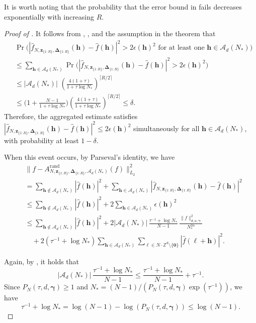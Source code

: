 \documentclass[pdflatex,sn-basic,Numbered]{sn-jnl}%
\newcommand{\rand}{\mathrm{rand}}
\newcommand{\bszero}{\boldsymbol{0}}
\newcommand{\bsh}{\boldsymbol{h}}
\newcommand{\bsl}{\boldsymbol{\ell}}
\newcommand{\bsz}{\boldsymbol{z}}
\newcommand{\bsgamma}{\boldsymbol{\gamma}}
\newcommand{\bsDelta}{\boldsymbol{\Delta}}
\newcommand{\ZZ}{\mathbb{Z}}
\newcommand{\Acal}{\mathcal{A}}
\theoremstyle{thmstyleone}%
\theoremstyle{thmstyletwo}%
\begin{document}
It is worth noting that the probability that the error bound in  fails decreases exponentially with increasing $R$.

\begin{proof}[Proof of ]
    It follows from , , and the assumption in the theorem that
    \begin{align*}
    & \Pr\Big(|\widehat{f}_{N,\bsz_{\{1{:}R\}},\bsDelta_{\{1{:}R\}}}(\bsh)-\widehat{f}(\bsh)|^2> 2\epsilon(\bsh)^2 \text{ for at least one }  \bsh\in \Acal_d(N_*)\Big)\\  
    &\le \sum_{\bsh\in \Acal_d(N_*)}\Pr\Big(|\widehat{f}_{N,\bsz_{\{1{:}R\}},\bsDelta_{\{1{:}R\}}}(\bsh)-\widehat{f}(\bsh)|^2> 2\epsilon(\bsh)^2\Big) \\
    &\le |\Acal_d(N_*)| \, \,  \left(\frac{4(1+\tau)}{1+\tau\log N_* }\right)^{\lceil R/2 \rceil} \\
    &\le  
    \Big(1+\frac{N-1}{1+\tau\log N_*}\Big)
    \left(\frac{4(1+\tau)}{1+\tau\log N_* }\right)^{\lceil R/2 \rceil} \le \delta.
    \end{align*}
    Therefore, the aggregated estimate satisfies $|\widehat{f}_{N,\bsz_{\{1{:}R\}},\bsDelta_{\{1{:}R\}}}(\bsh)-\widehat{f}(\bsh)|^2\leq 2\epsilon(\bsh)^2$ simultaneously for all $\bsh\in \Acal_d(N_*)$, with probability at least $1-\delta$.
    
    When this event occurs, by Parseval's identity, we have
    \begin{align*}
        &\|f-A^{\rand}_{N,\bsz_{\{1{:}R\}},\bsDelta_{\{1{:}R\}},\Acal_d(N_*)}(f)\|^2_{L_2}\\
        & = \sum_{\bsh\notin \mathcal{A}_d(N_*)} |\widehat{f}(\bsh)|^2+\sum_{\bsh\in \Acal_d(N_*)}|\widehat{f}_{N,\bsz_{\{1{:}R\}},\bsDelta_{\{1{:}R\}}}(\bsh)-\widehat{f}(\bsh)|^2\\
        & \le \sum_{\bsh\notin \mathcal{A}_d(N_*)} |\widehat{f}(\bsh)|^2+2\sum_{\bsh\in \Acal_d(N_*)}\epsilon(\bsh)^2\\
        & \le \sum_{\bsh\notin \mathcal{A}_d(N_*)} |\widehat{f}(\bsh)|^2 
        + 2 |\mathcal{A}_d(N_*)|\,\frac{\tau^{-1}+\log N_*}{N-1}\,\frac{\|f\|^2_{d,\alpha,\bsgamma}}{N_*^{2\alpha}}\\
        & \quad +2(\tau^{-1}+\log N_*)\sum_{\bsh\in \Acal_d(N_*)}\sum_{\bsl \in N\cdot \ZZ^d\setminus \{\bszero\} }|\widehat{f}(\bsl+\bsh)|^2.
    \end{align*}

    Again, by , it holds that
    \[ |\mathcal{A}_d(N_*)|\,\frac{\tau^{-1}+\log N_*}{N-1}\leq \frac{\tau^{-1}+\log N_*}{N-1}+\tau^{-1}.\]
    Since $P_N (\tau,d,\bsgamma)\geq 1$ and $N_*=(N-1)/(P_N (\tau,d,\bsgamma)\exp{(\tau^{-1})})$, we have
    \[ \tau^{-1}+\log N_*= \log (N-1)-\log(P_N (\tau,d,\bsgamma))\leq \log (N-1).\]
    

\end{proof}
\end{document}
